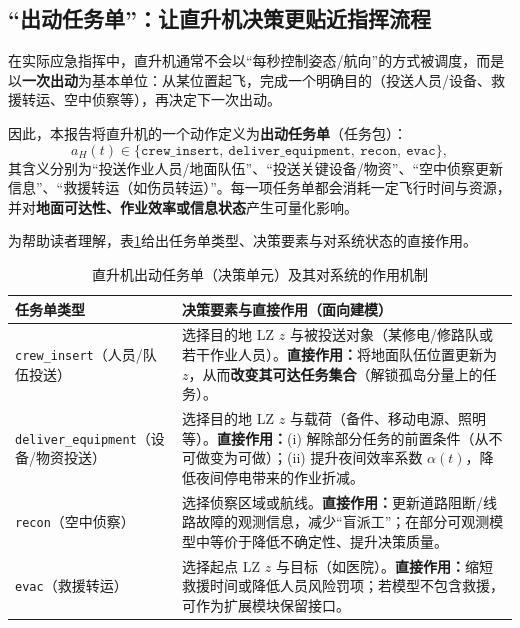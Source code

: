 \documentclass[UTF8,zihao=-4,a4paper,fontset=fandol]{ctexrep}
\begin{document}
\subsection{“出动任务单”：让直升机决策更贴近指挥流程}
在实际应急指挥中，直升机通常不会以“每秒控制姿态/航向”的方式被调度，而是以\textbf{一次出动}为基本单位：从某位置起飞，完成一个明确目的（投送人员/设备、救援转运、空中侦察等），再决定下一次出动。

因此，本报告将直升机的一个动作定义为\textbf{出动任务单}（任务包）：
\begin{equation}
  a_H(t)\in\{\texttt{crew\_insert},\ \texttt{deliver\_equipment},\ \texttt{recon},\ \texttt{evac}\},
\end{equation}
其含义分别为“投送作业人员/地面队伍”、“投送关键设备/物资”、“空中侦察更新信息”、“救援转运（如伤员转运）”。每一项任务单都会消耗一定飞行时间与资源，并对\textbf{地面可达性、作业效率或信息状态}产生可量化影响。

为帮助读者理解，表\ref{tab:missions}给出任务单类型、决策要素与对系统状态的直接作用。

\begin{table}[H]
\centering
\caption{直升机出动任务单（决策单元）及其对系统的作用机制}
\label{tab:missions}
\begin{tabularx}{0.98\textwidth}{lX}
\toprule
\textbf{任务单类型} & \textbf{决策要素与直接作用（面向建模）}\\
\midrule
\texttt{crew\_insert}（人员/队伍投送） & 选择目的地 LZ $z$ 与被投送对象（某修电/修路队或若干作业人员）。\textbf{直接作用：}将地面队伍位置更新为 $z$，从而\textbf{改变其可达任务集合}（解锁孤岛分量上的任务）。\\
\texttt{deliver\_equipment}（设备/物资投送） & 选择目的地 LZ $z$ 与载荷（备件、移动电源、照明等）。\textbf{直接作用：}(i) 解除部分任务的前置条件（从不可做变为可做）；(ii) 提升夜间效率系数 $\alpha(t)$，降低夜间停电带来的作业折减。\\
\texttt{recon}（空中侦察） & 选择侦察区域或航线。\textbf{直接作用：}更新道路阻断/线路故障的观测信息，减少“盲派工”；在部分可观测模型中等价于降低不确定性、提升决策质量。\\
\texttt{evac}（救援转运） & 选择起点 LZ $z$ 与目标（如医院）。\textbf{直接作用：}缩短救援时间或降低人员风险罚项；若模型不包含救援，可作为扩展模块保留接口。\\
\bottomrule
\end{tabularx}
\end{table}
\end{document}
